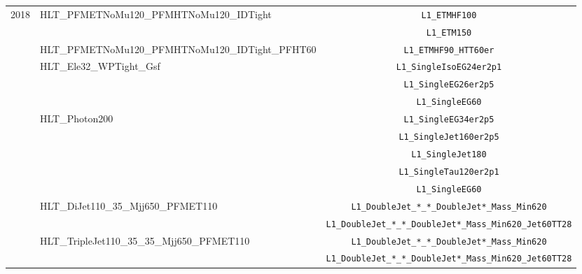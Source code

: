 \begin{table}[htbp]
\begin{tabular}{l l c}
        \multirow{15}{*}{2018} & \multirow{2}{*}{HLT\_PFMETNoMu120\_PFMHTNoMu120\_IDTight} & \texttt{L1\_ETMHF100}                    \\
                               &                                                           & \texttt{L1\_ETM150}                                           \\
                               & HLT\_PFMETNoMu120\_PFMHTNoMu120\_IDTight\_PFHT60          & \texttt{L1\_ETMHF90\_HTT60er}                                 \\\cline{2-3}
                               & \multirow{3}{*}{HLT\_Ele32\_WPTight\_Gsf}                 & \texttt{L1\_SingleIsoEG24er2p1}      \\
                               &                                                           & \texttt{L1\_SingleEG26er2p5}                                   \\
                               &                                                           & \texttt{L1\_SingleEG60}                                        \\\cline{2-3}

                               & \multirow{5}{*}{HLT\_Photon200}                           & \texttt{L1\_SingleEG34er2p5}          \\
                               &                                                           & \texttt{L1\_SingleJet160er2p5}                                 \\
                               &                                                           & \texttt{L1\_SingleJet180}                                      \\
                               &                                                           & \texttt{L1\_SingleTau120er2p1}                                 \\
                               &                                                           & \texttt{L1\_SingleEG60}                                        \\\cline{2-3}
                               & \multirow{2}{*}{HLT\_DiJet110\_35\_Mjj650\_PFMET110}      & \texttt{L1\_DoubleJet\_*\_*\_DoubleJet*\_Mass\_Min620}         \\
                               &                                                      & \texttt{L1\_DoubleJet\_*\_*\_DoubleJet*\_Mass\_Min620\_Jet60TT28} 
                               \\\cline{2-3}
                               & \multirow{2}{*}{HLT\_TripleJet110\_35\_35\_Mjj650\_PFMET110} & \texttt{L1\_DoubleJet\_*\_*\_DoubleJet*\_Mass\_Min620}  \\
                               &                                                             & \texttt{L1\_DoubleJet\_*\_*\_DoubleJet*\_Mass\_Min620\_Jet60TT28}  \\\hline



\end{tabular}
\end{table}
